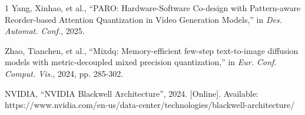 \begin{thebibliography}{1}
Yang, Xinhao, et al., ``PARO: Hardware-Software Co-design with Pattern-aware Reorder-based Attention Quantization in Video Generation Models,'' in \textit{Des. Automat. Conf.}, 2025.

Zhao, Tianchen, et al., ``Mixdq: Memory-efficient few-step text-to-image diffusion models with metric-decoupled mixed precision quantization,'' in \textit{Eur. Conf. Comput. Vis.}, 2024, pp. 285-302.

NVIDIA, ``NVIDIA Blackwell Architecture'', 2024. [Online]. Available: https://www.nvidia.com/en-us/data-center/technologies/blackwell-architecture/

\end{thebibliography}